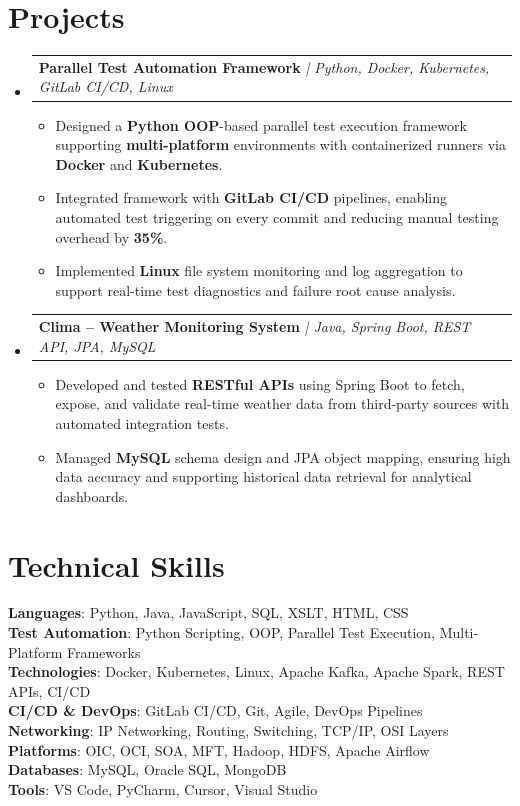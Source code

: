 \documentclass[letterpaper,11pt]{article}
\makeatletter
\newcommand{\resumeItem}[1]{
  \item\small{
    {#1 \vspace{-2pt}}
  }
}
\newcommand{\resumeProjectHeading}[2]{
    \item
    \begin{tabular*}{0.97\textwidth}{l@{\extracolsep{\fill}}r}
      \small#1 & #2 \\
    \end{tabular*}\vspace{-7pt}
}
\newcommand{\resumeSubHeadingListStart}{\begin{itemize}[leftmargin=0.15in, label={}]}
\newcommand{\resumeSubHeadingListEnd}{\end{itemize}}
\newcommand{\resumeItemListStart}{\begin{itemize}}
\newcommand{\resumeItemListEnd}{\end{itemize}\vspace{-5pt}}
\makeatother
\begin{document}
\section{Projects}
\resumeSubHeadingListStart
    \resumeProjectHeading
        {\textbf{Parallel Test Automation Framework} \textit{| Python, Docker, Kubernetes, GitLab CI/CD, Linux}}{}
    \resumeItemListStart
        \resumeItem{Designed a \textbf{Python OOP}-based parallel test execution framework supporting \textbf{multi-platform} environments with containerized runners via \textbf{Docker} and \textbf{Kubernetes}.}
        \resumeItem{Integrated framework with \textbf{GitLab CI/CD} pipelines, enabling automated test triggering on every commit and reducing manual testing overhead by \textbf{35\%}.}
        \resumeItem{Implemented \textbf{Linux} file system monitoring and log aggregation to support real-time test diagnostics and failure root cause analysis.}
    \resumeItemListEnd
    \resumeProjectHeading
        {\textbf{Clima -- Weather Monitoring System} \textit{| Java, Spring Boot, REST API, JPA, MySQL}}{}
    \resumeItemListStart
        \resumeItem{Developed and tested \textbf{RESTful APIs} using Spring Boot to fetch, expose, and validate real-time weather data from third-party sources with automated integration tests.}
        \resumeItem{Managed \textbf{MySQL} schema design and JPA object mapping, ensuring high data accuracy and supporting historical data retrieval for analytical dashboards.}
    \resumeItemListEnd
\resumeSubHeadingListEnd

\section{Technical Skills}
\begin{itemize}[leftmargin=0.15in, label={}]
    \small{\item{
        \textbf{Languages}{: Python, Java, JavaScript, SQL, XSLT, HTML, CSS} \\
        \textbf{Test Automation}{: Python Scripting, OOP, Parallel Test Execution, Multi-Platform Frameworks} \\
        \textbf{Technologies}{: Docker, Kubernetes, Linux, Apache Kafka, Apache Spark, REST APIs, CI/CD} \\
        \textbf{CI/CD \& DevOps}{: GitLab CI/CD, Git, Agile, DevOps Pipelines} \\
        \textbf{Networking}{: IP Networking, Routing, Switching, TCP/IP, OSI Layers} \\
        \textbf{Platforms}{: OIC, OCI, SOA, MFT, Hadoop, HDFS, Apache Airflow} \\
        \textbf{Databases}{: MySQL, Oracle SQL, MongoDB} \\
        \textbf{Tools}{: VS Code, PyCharm, Cursor, Visual Studio}
    }}
\end{itemize}
\end{document}

